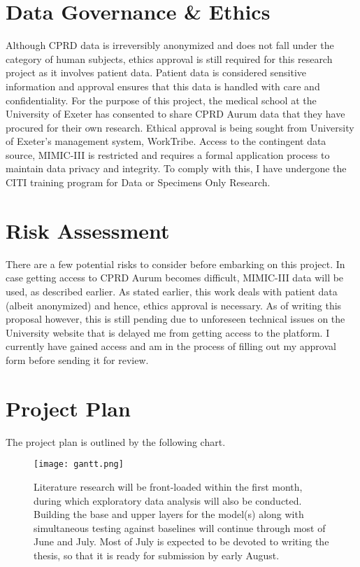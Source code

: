 \documentclass[%
 reprint,
 amsmath,amssymb,
 aps,
 nofootinbib,
]{revtex4-2}
\theoremstyle{definition}
\begin{document}
\section{\label{gov}Data Governance \& Ethics}
Although CPRD data is irreversibly anonymized and does not fall under the category of human subjects, ethics approval is still required for this research project as it involves patient data. Patient data is considered sensitive information and approval ensures that this data is handled with care and confidentiality. For the purpose of this project, the medical school at the University of Exeter has consented to share CPRD Aurum data that they have procured for their own research. Ethical approval is being sought from University of Exeter's management system, WorkTribe. Access to the contingent data source, MIMIC-III is restricted and requires a formal application process to maintain data privacy and integrity. To comply with this, I have undergone the CITI training program for Data or Specimens Only Research.

\section{\label{risk}Risk Assessment}
There are a few potential risks to consider before embarking on this project. In case getting access to CPRD Aurum becomes difficult, MIMIC-III data will be used, as described earlier. As stated earlier, this work deals with patient data (albeit anonymized) and hence, ethics approval is necessary. As of writing this proposal however, this is still pending due to unforeseen technical issues on the University website that is delayed me from getting access to the platform. I currently have gained access and am in the process of filling out my approval form before sending it for review.

\section{\label{plan}Project Plan}
The project plan is outlined by the following chart.\\

\begin{figure}[H]
\centering
\texttt{[image: gantt.png]}
\caption{\label{fig:gantt} Literature research will be front-loaded within the first month, during which exploratory data analysis will also be conducted. Building the base and upper layers for the model(s) along with simultaneous testing against baselines will continue through most of June and July. Most of July is expected to be devoted to writing the thesis, so that it is ready for submission by early August.}
\end{figure}
\end{document}

